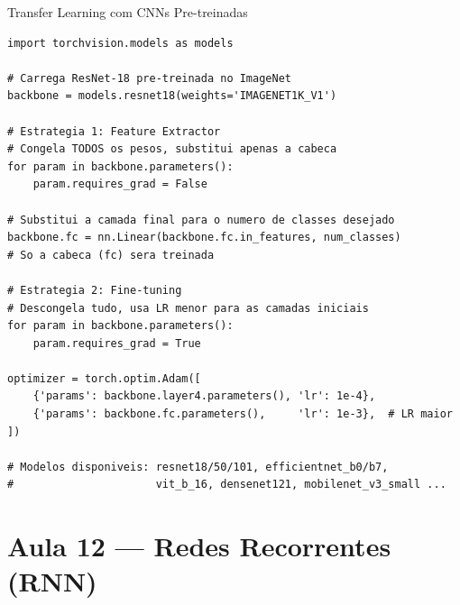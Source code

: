 \documentclass[aspectratio=169, 10pt]{beamer}
\begin{document}
\begin{frame}[fragile]{Transfer Learning com CNNs Pre-treinadas}
\begin{lstlisting}
import torchvision.models as models

# Carrega ResNet-18 pre-treinada no ImageNet
backbone = models.resnet18(weights='IMAGENET1K_V1')

# Estrategia 1: Feature Extractor
# Congela TODOS os pesos, substitui apenas a cabeca
for param in backbone.parameters():
    param.requires_grad = False

# Substitui a camada final para o numero de classes desejado
backbone.fc = nn.Linear(backbone.fc.in_features, num_classes)
# So a cabeca (fc) sera treinada

# Estrategia 2: Fine-tuning
# Descongela tudo, usa LR menor para as camadas iniciais
for param in backbone.parameters():
    param.requires_grad = True

optimizer = torch.optim.Adam([
    {'params': backbone.layer4.parameters(), 'lr': 1e-4},
    {'params': backbone.fc.parameters(),     'lr': 1e-3},  # LR maior
])

# Modelos disponiveis: resnet18/50/101, efficientnet_b0/b7,
#                      vit_b_16, densenet121, mobilenet_v3_small ...
\end{lstlisting}
\end{frame}

\section{Aula 12 — Redes Recorrentes (RNN)}
\end{document}
